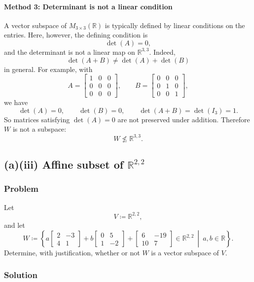\documentclass[12pt]{article}
\newcommand{\R}{\mathbb{R}}
\begin{document}
\paragraph{Method 3: Determinant is not a linear condition}
A vector subspace of \(M_{3\times 3}(\R)\) is typically defined by linear conditions on the entries. Here, however, the defining condition is
\[
\det(A)=0,
\]
and the determinant is not a linear map on \(\R^{3,3}\). Indeed,
\[
\det(A+B)\neq \det(A)+\det(B)
\]
in general. For example, with
\[
A=\begin{bmatrix}1&0&0\\0&0&0\\0&0&0\end{bmatrix},
\qquad
B=\begin{bmatrix}0&0&0\\0&1&0\\0&0&1\end{bmatrix},
\]
we have
\[
\det(A)=0,\qquad \det(B)=0,\qquad \det(A+B)=\det(I_3)=1.
\]
So matrices satisfying \(\det(A)=0\) are not preserved under addition. Therefore \(W\) is not a subspace:
\[
\boxed{W\not\le \R^{3,3}.}
\]

\bigskip

\newpage
\subsection{(a)(iii) Affine subset of \(\R^{2,2}\)}
\subsubsection{Problem}
Let
\[
V \coloneqq \R^{2,2},
\]
and let
\[
W \coloneqq
\left\{
a\begin{bmatrix}2&-3\\4&1\end{bmatrix}
+b\begin{bmatrix}0&5\\1&-2\end{bmatrix}
+\begin{bmatrix}6&-19\\10&7\end{bmatrix}
\in \R^{2,2}
\ \middle|\
a,b\in\R
\right\}.
\]
Determine, with justification, whether or not \(W\) is a vector subspace of \(V\).

\subsubsection{Solution}
\end{document}
